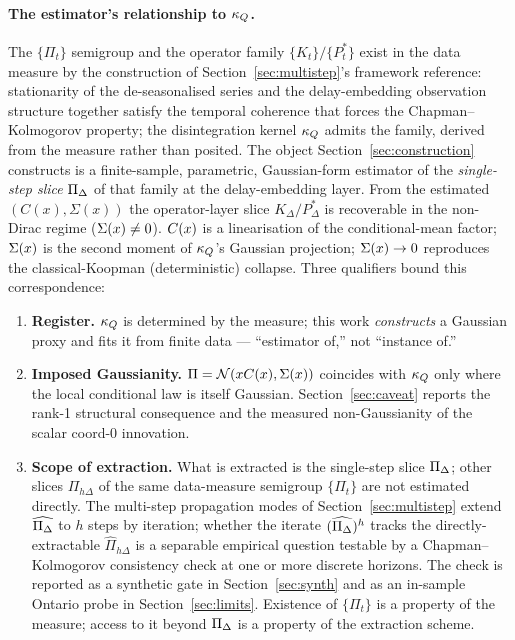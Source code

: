 \paragraph{The estimator's relationship to \(\kappa_{Q}\).}
The \(\{\Pi_t\}\) semigroup and the operator family
\(\{K_t\} / \{P_t^*\}\) exist in the data measure by the construction
of Section~\ref{sec:multistep}'s framework reference: stationarity of
the de-seasonalised series and the delay-embedding observation
structure together satisfy the temporal coherence that forces the
Chapman--Kolmogorov property; the disintegration kernel \(\kappa_{Q}\)
admits the family, derived from the measure rather than posited.
The object Section~\ref{sec:construction} constructs is a
finite-sample, parametric, Gaussian-form estimator of the
\emph{single-step slice} \(\Pi_{\Delta}\) of that family at the
delay-embedding layer. From the estimated \((C(x), \Sigma(x))\) the
operator-layer slice \(K_{\Delta} / P_{\Delta}^{*}\) is recoverable
in the non-Dirac regime (\(\Sigma(x) \neq 0\)).
\(C(x)\) is a linearisation of the conditional-mean factor; \(\Sigma(x)\) is
the second moment of \(\kappa_{Q}\)'s Gaussian projection; \(\Sigma(x) \to 0\)
reproduces the classical-Koopman (deterministic) collapse. Three
qualifiers bound this correspondence:

\begin{enumerate}
  \item \textbf{Register.} \(\kappa_{Q}\) is determined by the measure; this
  work \emph{constructs} a Gaussian proxy and fits it from finite
  data --- ``estimator of,'' not ``instance of.''

  \item \textbf{Imposed Gaussianity.} \(\Pi = \mathcal{N}(x C(x), \Sigma(x))\)
  coincides with \(\kappa_{Q}\) only where the local conditional law is
  itself Gaussian. Section~\ref{sec:caveat} reports the
  rank-1 structural consequence and the measured non-Gaussianity of
  the scalar coord-0 innovation.

  \item \textbf{Scope of extraction.} What is extracted is the
  single-step slice \(\Pi_{\Delta}\); other slices
  \(\Pi_{h\Delta}\) of the same data-measure semigroup
  \(\{\Pi_t\}\) are not estimated directly. The multi-step
  propagation modes of Section~\ref{sec:multistep} extend
  \(\widehat{\Pi_{\Delta}}\) to \(h\) steps by iteration; whether the
  iterate \((\widehat{\Pi_{\Delta}})^{h}\) tracks the directly-extractable
  \(\widehat{\Pi}_{h\Delta}\) is a separable empirical question
  testable by a Chapman--Kolmogorov consistency check at one or more
  discrete horizons. The check is reported as a synthetic gate in
  Section~\ref{sec:synth} and as an in-sample Ontario probe in
  Section~\ref{sec:limits}. Existence of \(\{\Pi_t\}\) is a property
  of the measure; access to it beyond \(\Pi_{\Delta}\) is a property of
  the extraction scheme.
\end{enumerate}

